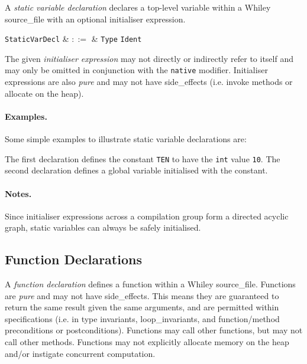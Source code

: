 A {\em static variable declaration} declares a top-level variable
within a Whiley \gls{source_file} with an optional initialiser
expression.

\begin{syntax}
  \verb+StaticVarDecl+ & $::=$ & \verb+Type+ \verb+Ident+\ \big[= \verb+Expr+\big]\\
\end{syntax}

The given {\em initialiser expression} may not directly or indirectly
refer to itself and may only be omitted in conjunction with the
\lstinline{native} modifier.  Initialiser expressions are also {\em
  pure} and may not have \glspl{side_effect} (i.e. invoke methods or
allocate on the heap).

\paragraph{Examples.}  Some simple examples to illustrate static
variable declarations are:



The first declaration defines the constant \lstinline{TEN} to have the
\lstinline{int} value \lstinline{10}.  The second declaration defines
a global variable initialised with the constant.

\paragraph{Notes.}  Since initialiser expressions across a compilation
group form a directed acyclic graph, static variables can always be
safely initialised.


\subsection{Function Declarations}
\label{c_source_files_function_decl}

A {\em function declaration} defines a function within a Whiley
\gls{source_file}.  Functions are {\em pure} and may not have
\glspl{side_effect}.  This means they are guaranteed to return the
same result given the same arguments, and are permitted within
specifications (i.e. in type invariants, \gls{loop_invariant}s, and
function/method \gls{precondition}s or \gls{postcondition}s).
Functions may call other functions, but may not call other methods.
Functions may not explicitly allocate memory on the heap and/or
instigate concurrent computation.


